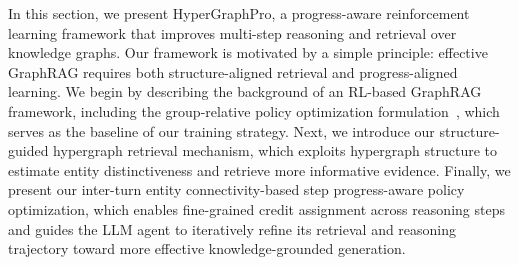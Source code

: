 In this section, we present HyperGraphPro, a progress-aware reinforcement learning framework that improves multi-step reasoning and retrieval over knowledge graphs.
Our framework is motivated by a simple principle: effective GraphRAG requires both structure-aligned retrieval and progress-aligned learning.
We begin by describing the background of an RL-based GraphRAG framework, including the group-relative policy optimization formulation~\cite{guo2025deepseek}, which serves as the baseline of our training strategy.
Next, we introduce our structure-guided hypergraph retrieval mechanism, which exploits hypergraph structure to estimate entity distinctiveness and retrieve more informative evidence.
Finally, we present our inter-turn entity connectivity-based step progress-aware policy optimization, which enables fine-grained credit assignment across reasoning steps and guides the LLM agent to iteratively refine its retrieval and reasoning trajectory toward more effective knowledge-grounded generation.